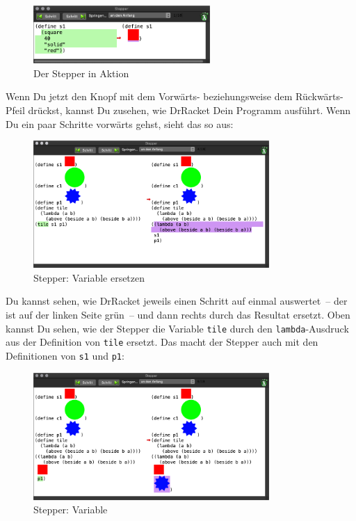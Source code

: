 \begin{figure}[H]
  \centering
  \includegraphics[width=0.6\textwidth]{elemente/stepper-0}
  \caption{Der Stepper in Aktion}
  \label{fig:stepper-0}
\end{figure}
%
\noindent Wenn Du jetzt den Knopf mit dem Vorwärts- beziehungsweise
dem Rückwärts-Pfeil drückst, kannst Du zusehen, wie DrRacket Dein
Programm ausführt.  Wenn Du ein paar Schritte vorwärts gehst, sieht
das so aus:
%
\begin{figure}[H]
  \centering
  \includegraphics[width=0.8\textwidth]{elemente/stepper-1}
  \caption{Stepper: Variable ersetzen}
  \label{fig:stepper-1}
\end{figure}
%
\noindent Du kannst sehen, wie DrRacket jeweils einen Schritt auf
einmal auswertet~-- der ist auf der linken Seite grün~-- und dann
rechts durch das Resultat ersetzt.  Oben kannst Du sehen, wie der
Stepper die Variable \lstinline{tile} durch den \lstinline{lambda}-Ausdruck
aus der Definition von \lstinline{tile} ersetzt. Das macht der Stepper
auch mit den Definitionen von \lstinline{s1} und \lstinline{p1}:
%
\begin{figure}[H]
  \centering
  \includegraphics[width=0.8\textwidth]{elemente/stepper-2}
  \caption{Stepper: Variable}
  \label{fig:stepper-2}
\end{figure}

